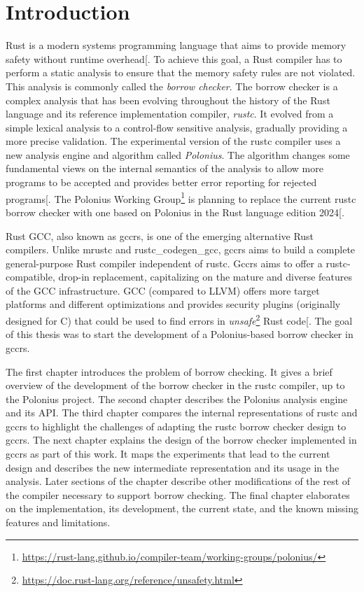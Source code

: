 \documentclass[
  11pt,
  twoside]{report}
\DeclareRobustCommand{\href}[2]{#2\footnote{\url{#1}}}
\begin{document}
\chapter{Introduction}\label{sec:introduction}

Rust is a modern systems programming language that aims to provide
memory safety without runtime
overhead{[}\citeproc{ref-Matsakis2014}{1}{]}. To achieve this goal, a
Rust compiler has to perform a static analysis to ensure that the memory
safety rules are not violated. This analysis is commonly called the
\emph{borrow checker}. The borrow checker is a complex analysis that has
been evolving throughout the history of the Rust language and its
reference implementation compiler, \emph{rustc}. It evolved from a
simple lexical analysis to a control-flow sensitive analysis, gradually
providing a more precise validation. The experimental version of the
rustc compiler uses a new analysis engine and algorithm called
\emph{Polonius}. The algorithm changes some fundamental views on the
internal semantics of the analysis to allow more programs to be accepted
and provides better error reporting for rejected
programs{[}\citeproc{ref-RustBelt}{2}{]}. The
\href{https://rust-lang.github.io/compiler-team/working-groups/polonius/}{Polonius
Working Group} is planning to replace the current rustc borrow checker
with one based on Polonius in the Rust language edition
2024{[}\citeproc{ref-poloniusupdate}{3}{]}.

Rust GCC, also known as gccrs, is one of the emerging alternative Rust
compilers. Unlike mrustc and rustc\_codegen\_gcc, gccrs aims to build a
complete general-purpose Rust compiler independent of rustc. Gccrs aims
to offer a rustc-compatible, drop-in replacement, capitalizing on the
mature and diverse features of the GCC infrastructure. GCC (compared to
LLVM) offers more target platforms and different optimizations and
provides security plugins (originally designed for C) that could be used
to find errors in
\href{https://doc.rust-lang.org/reference/unsafety.html}{\emph{unsafe}}
Rust code{[}\citeproc{ref-eurorust}{4}{]}. The goal of this thesis was
to start the development of a Polonius-based borrow checker in gccrs.

The first chapter introduces the problem of borrow checking. It gives a
brief overview of the development of the borrow checker in the rustc
compiler, up to the Polonius project. The second chapter describes the
Polonius analysis engine and its API. The third chapter compares the
internal representations of rustc and gccrs to highlight the challenges
of adapting the rustc borrow checker design to gccrs. The next chapter
explains the design of the borrow checker implemented in gccrs as part
of this work. It maps the experiments that lead to the current design
and describes the new intermediate representation and its usage in the
analysis. Later sections of the chapter describe other modifications of
the rest of the compiler necessary to support borrow checking. The final
chapter elaborates on the implementation, its development, the current
state, and the known missing features and limitations.
\end{document}
